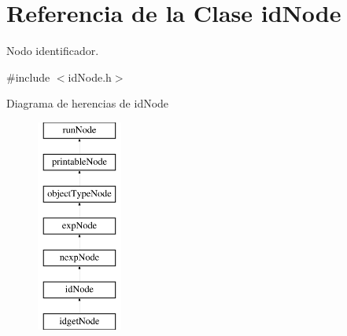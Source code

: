 \hypertarget{classidNode}{\section{Referencia de la Clase id\-Node}
\label{classidNode}
}


Nodo identificador.  




{\ttfamily \#include $<$id\-Node.\-h$>$}

Diagrama de herencias de id\-Node\begin{figure}[H]
\begin{center}
\leavevmode
\includegraphics[height=7.000000cm]{classidNode}
\end{center}
\end{figure}

